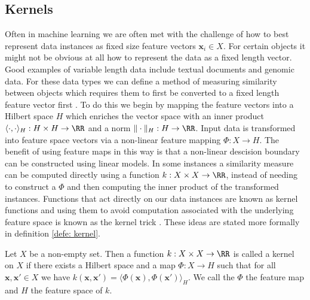 \subsection{Kernels}\label{Section1.1}

Often in machine learning we are often met with the challenge of how to best represent data instances as fixed size feature vectors $\bm{x}_i \in X$. For certain objects it might not be obvious at all how to represent the data as a fixed length vector. Good examples of variable length data include textual documents and genomic data. For these data types we can define a method of measuring similarity between objects which requires them to first be converted to a fixed length feature vector first \cite{MurphyKevinP2012Ml}. To do this we begin by mapping the feature vectors into a Hilbert space $H$ which enriches the vector space with an inner product $\langle \cdot , \cdot \rangle_H : H \times H \to \RR$ and a norm $\| \cdot \|_H : H \to \RR$. Input data is transformed into feature space vectors via a non-linear feature mapping $\Phi : X \to H$. The benefit of using feature maps in this way is that a non-linear descision boundary can be constructed using linear models. In some instances a similarity measure can be computed directly using a function $k : X \times X \to \RR$, instead of needing to construct a $\Phi$ and then computing the inner product of the transformed instances. Functions that act directly on our data instances are known as kernel functions and using them to avoid computation associated with the underlying feature space is known as the kernel trick \cite{SteinwartIngo2008SVMb}. These ideas are stated more formally in definition \ref{defe: kernel}.

\begin{defe}[Kernel] \label{defe: kernel}
    Let $X$ be a non-empty set. Then a function $k : X \times X \to \RR$ is called a kernel on $X$ if there exists a Hilbert space and a map $\Phi : X \to H$ such that for all $\bm{x} , \bm{x}' \in X$ we have $k \left( \bm{x} , \bm{x}' \right) = \langle \Phi \left( \bm{x} \right), \Phi \left( \bm{x}' \right) \rangle_H$. We call the $\Phi$ the feature map and $H$ the feature space of $k$.
\end{defe}

